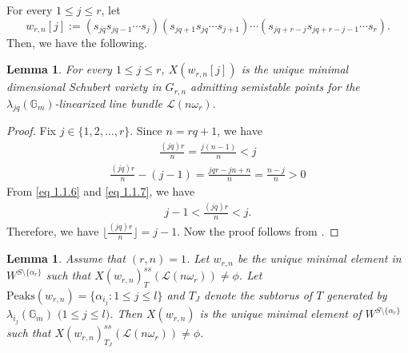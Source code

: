 \documentclass[12pt,reqno]{amsart}
\numberwithin{equation}{section}
\newtheorem{lemma}[theorem]{Lemma}
\theoremstyle{definition}
\begin{document}
For every $1\leq j\leq r$, let $$w_{r,n}[j]:=(s_{jq}s_{jq-1}\cdots s_{j})(s_{jq+1}s_{jq}\cdots s_{j+1})\cdots(s_{jq+r-j}s_{jq+r-j-1}\cdots s_{r}).$$ Then, we have the following.
\begin{lemma}\label{section:combinatorial result:1}For every $1\leq j\leq r$, $X(w_{r,n}[j])$ is the unique minimal dimensional Schubert variety in $G_{r,n}$ admitting semistable points for the $\lambda_{jq}(\mathbb{G}_{m})$-linearized line bundle $\mathcal{L}(n\omega_{r})$.
\end{lemma}
\begin{proof}
	Fix $j\in\{1,2,\ldots,r\}$. Since $n=rq+1$, we have \begin{align}\label{eq 1.1.6}
		\frac{(jq)r}{n}=\frac{j(n-1)}{n}<j
	\end{align}
\begin{align}\label{eq 1.1.7}
	\frac{(jq)r}{n}-(j-1)=\frac{jqr-jn+n}{n}=\frac{n-j}{n}>0
\end{align}
From \cref{eq 1.1.6} and \cref{eq 1.1.7}, we have 
\begin{align*}
	j-1<\frac{(jq)r}{n}<j.
\end{align*}
Therefore, we have $\lfloor\frac{(jq)r}{n}\rfloor=j-1$. Now the proof follows from \cite[Lemma 5.8]{GKgit}.
\end{proof}
\begin{lemma}\label{sction:combinatorial resul:2}
	Assume that $(r,n)=1$. Let $w_{r,n}$ be the unique minimal element in $W^{S\setminus\{\alpha_{r}\}}$ such that $X(w_{r,n})^{ss}_{T}(\mathcal{L}(n\omega_{r}))\neq \phi$. Let $\mathrm{Peaks}(w_{r,n})=\{\alpha_{i_{j}}:1\leq j\leq l\}$ and $T_{J}$ denote the subtorus of $T$ generated by $\lambda_{i_{j}}(\mathbb{G}_{m})$ $($$1\le j\le l$$)$. Then $X(w_{r,n})$ is the unique minimal element of $W^{S\setminus\{\alpha_{r}\}}$ such that $X(w_{r,n})^{ss}_{T_{J}}(\mathcal{L}(n\omega_{r}))\neq \phi$.
\end{lemma}
\end{document}
